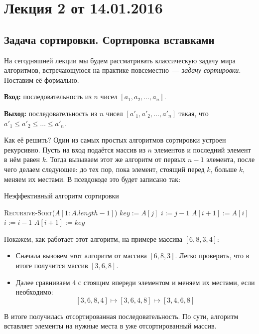 


	
\section{Лекция 2 от 14.01.2016}

\subsection{Задача сортировки. Сортировка вставками}
На сегодняшней лекции мы будем рассматривать классическую задачу мира алгоритмов, встречающуюся на практике повсеместно~--- \emph{задачу сортировки}. Поставим её формально.

\textbf{Вход:} последовательность из \(n\) чисел \([a_{1}, a_{2}, \ldots, a_{n}]\).

\textbf{Выход:} последовательность из \(n\) чисел \([a'_{1}, a'_{2}, \ldots, a'_{n}]\) такая, что \(a'_{1} \leqslant a'_{2} \leqslant \ldots \leqslant a'_{n}\).

Как её решить? Один из самых простых алгоритмов сортировки устроен рекурсивно. Пусть на вход подаётся массив из \(n\) элементов и последний элемент в нём равен \(k\). Тогда вызываем этот же алгоритм от первых \(n - 1\) элемента, после чего делаем следующее: до тех пор, пока элемент, стоящий перед \(k\), больше \(k\), меняем их местами. В псевдокоде это будет записано так:

\begin{algorithm}[H]
	\caption{Неэффективный алгоритм сортировки}
\begin{algorithmic}[1]
		\State \textsc{Recursive-Sort}($A[1:A.length - 1]$)
		\State \(key \mathrel{:=} A[j]\)
		\State \(i \mathrel{:=} j - 1\)
			\State \(A[i + 1] \mathrel{:=} A[i]\)
			\State \(i \mathrel{:=} i - 1\)
		\EndWhile
		\State \(A[i + 1] \mathrel{:=} key\)
	\EndIf
	\EndFunction
\end{algorithmic}
\end{algorithm}
Покажем, как работает этот алгоритм, на примере массива \([6, 8, 3, 4]\):

\begin{itemize}
	\item Сначала вызовем этот алгоритм от массива \([6, 8, 3]\). Легко проверить, что в итоге получится массив \([3, 6, 8]\).
	\item Далее сравниваем 4 с стоящим впереди элементом и меняем их местами, если необходимо:
	\[[3, 6, 8, 4] \mapsto [3, 6, 4, 8] \mapsto [3, 4, 6, 8]\]
\end{itemize}
В итоге получилась отсортированная последовательность. По сути, алгоритм вставляет элементы на нужные места в уже отсортированный массив.

